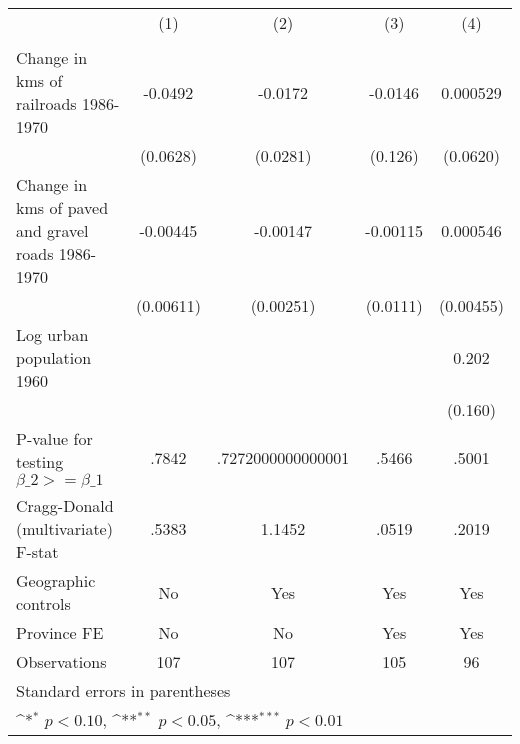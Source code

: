{
\def\sym#1{\ifmmode^{#1}\else\(^{#1}\)\fi}
\begin{tabular}{l*{4}{c}}
\hline\hline
                &\multicolumn{1}{c}{(1)}&\multicolumn{1}{c}{(2)}&\multicolumn{1}{c}{(3)}&\multicolumn{1}{c}{(4)}\\
                &\multicolumn{1}{c}{}&\multicolumn{1}{c}{}&\multicolumn{1}{c}{}&\multicolumn{1}{c}{}\\
\hline
Change in kms of railroads 1986-1970&  -0.0492         &  -0.0172         &  -0.0146         & 0.000529         \\
                & (0.0628)         & (0.0281)         &  (0.126)         & (0.0620)         \\
[1em]
Change in kms of paved and gravel roads 1986-1970& -0.00445         & -0.00147         & -0.00115         & 0.000546         \\
                &(0.00611)         &(0.00251)         & (0.0111)         &(0.00455)         \\
[1em]
Log urban population 1960&                  &                  &                  &    0.202         \\
                &                  &                  &                  &  (0.160)         \\
\hline
P-value for testing $\beta\_{2} >= \beta\_{1}$&    .7842         &.7272000000000001         &    .5466         &    .5001         \\
Cragg-Donald (multivariate) F-stat&    .5383         &   1.1452         &    .0519         &    .2019         \\
Geographic controls&       No         &      Yes         &      Yes         &      Yes         \\
Province FE     &       No         &       No         &      Yes         &      Yes         \\
Observations    &      107         &      107         &      105         &       96         \\
\hline\hline
\multicolumn{5}{l}{\footnotesize Standard errors in parentheses}\\
\multicolumn{5}{l}{\footnotesize \sym{*} \(p<0.10\), \sym{**} \(p<0.05\), \sym{***} \(p<0.01\)}\\
\end{tabular}
}
